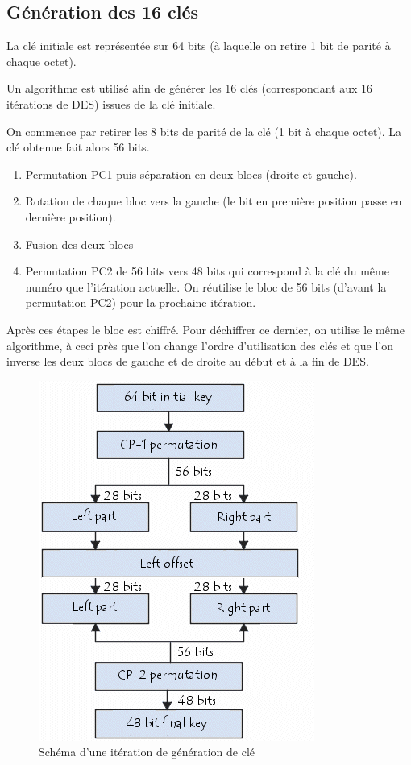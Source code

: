 \documentclass[a4paper,12pt]{article}
\begin{document}
\subsection{Génération des 16 clés}	
	
La clé initiale est représentée sur 64 bits (à laquelle on retire 1 bit de parité à chaque octet). 

Un algorithme est utilisé afin de générer les 16 clés (correspondant aux 16 itérations de DES) issues de la clé initiale. 
	
On commence par retirer les 8 bits de parité de la clé (1 bit à chaque octet). La clé obtenue fait alors 56 bits.
\begin{enumerate}
\item Permutation PC1 puis séparation en deux blocs (droite et gauche).
\item Rotation de chaque bloc vers la gauche (le bit en première position passe en dernière position).
\item Fusion des deux blocs
\item Permutation PC2 de 56 bits vers 48 bits qui correspond à la clé du même numéro que l'itération actuelle. On réutilise le bloc de 56 bits (d'avant la permutation PC2) pour la prochaine itération.
\end{enumerate}

Après ces étapes le bloc est chiffré. Pour déchiffrer ce dernier, on utilise le même algorithme, à ceci près que l'on change l'ordre d'utilisation des clés et que l'on inverse les deux blocs de gauche et de droite au début et à la fin de DES.

\begin{figure}[h]
\centering
\includegraphics[scale=0.80]{./images/keygen.png}
\caption{Schéma d'une itération de génération de clé}
\label{fig:keygen}
\end{figure}
\end{document}
